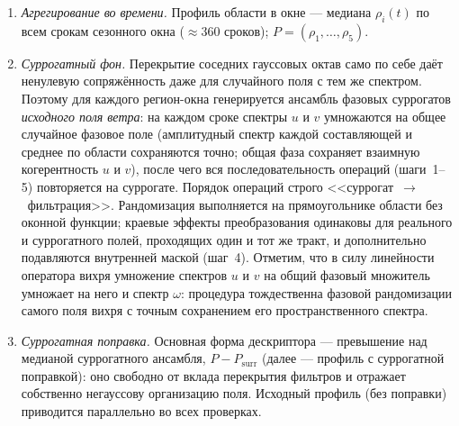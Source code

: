 \documentclass[11pt,a4paper]{article}
\begin{document}
\begin{enumerate}
\item \emph{Агрегирование во времени.} Профиль области в окне --- медиана $\rho_i(t)$ по всем срокам сезонного окна ($\approx$360 сроков); $P=(\rho_1,\dots,\rho_5)$.
\item \emph{Суррогатный фон.} Перекрытие соседних гауссовых октав само по себе даёт ненулевую сопряжённость даже для случайного поля с тем же спектром. Поэтому для каждого регион-окна генерируется ансамбль фазовых суррогатов \emph{исходного поля ветра}: на каждом сроке спектры $u$ и $v$ умножаются на общее случайное фазовое поле (амплитудный спектр каждой составляющей и среднее по области сохраняются точно; общая фаза сохраняет взаимную когерентность $u$ и $v$), после чего вся последовательность операций (шаги~1--5) повторяется на суррогате. Порядок операций строго <<суррогат~$\to$~фильтрация>>. Рандомизация выполняется на прямоугольнике области без оконной функции; краевые эффекты преобразования одинаковы для реального и суррогатного полей, проходящих один и тот же тракт, и дополнительно подавляются внутренней маской (шаг~4). Отметим, что в силу линейности оператора вихря умножение спектров $u$ и $v$ на общий фазовый множитель умножает на него и спектр $\omega$: процедура тождественна фазовой рандомизации самого поля вихря с точным сохранением его пространственного спектра.
\item \emph{Суррогатная поправка.} Основная форма дескриптора --- превышение над медианой суррогатного ансамбля, $P-P_{\mathrm{surr}}$ (далее --- профиль с суррогатной поправкой): оно свободно от вклада перекрытия фильтров и отражает собственно негауссову организацию поля. Исходный профиль (без поправки) приводится параллельно во всех проверках.
\end{enumerate}
\end{document}
